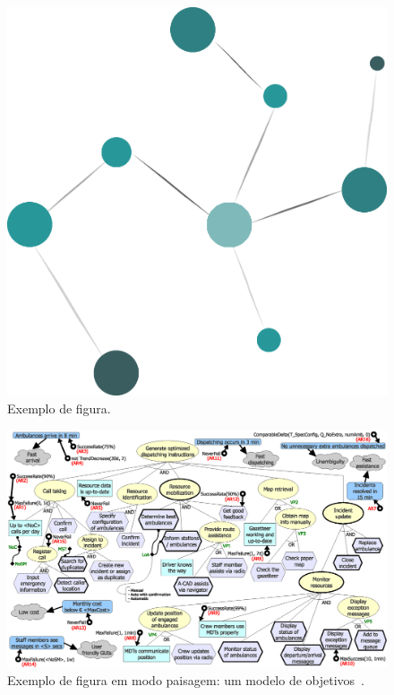 \begin{figure}
\centering
\includegraphics[width=.25\textwidth]{figuras/image-home.png} 
\caption{Exemplo de figura.}
\label{fig-intro-exemplo}
\end{figure}

\begin{figure}
\centering
\includegraphics[width=\textwidth]{figuras/fig-intro-exemplosideways} 
\caption{Exemplo de figura em modo paisagem: um modelo de objetivos~\cite{souza-mylopoulos:spe13}.}
\label{fig-intro-exemplosideways}
\end{figure}